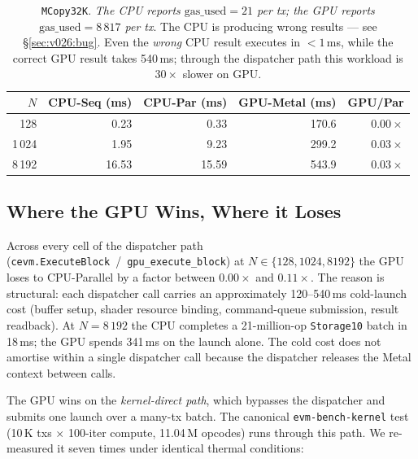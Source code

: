 \begin{table}[h]
\centering
\small
\begin{tabular}{rrrrr}
\toprule
$N$ & CPU-Seq (ms) & CPU-Par (ms) & GPU-Metal (ms) & GPU/Par \\
\midrule
128    & 0.23  & 0.33  & 170.6 & $0.00\times$ \\
1\,024 & 1.95  & 9.23  & 299.2 & $0.03\times$ \\
8\,192 & 16.53 & 15.59 & 543.9 & $0.03\times$ \\
\bottomrule
\end{tabular}
\caption{\texttt{MCopy32K}. \emph{The CPU reports
$\text{gas\_used} = 21$ per tx; the GPU reports $\text{gas\_used} =
8\,817$ per tx}. The CPU is producing wrong results --- see
\S\ref{sec:v026:bug}. Even the \emph{wrong} CPU result executes in
$<1$\,ms, while the correct GPU result takes 540\,ms; through the
dispatcher path this workload is $30\times$ slower on GPU.}
\label{tab:v026-mcopy}
\end{table}

\subsection{Where the GPU Wins, Where it Loses}
\label{sec:v026:winloss}

Across every cell of the dispatcher path
(\texttt{cevm.ExecuteBlock}~/~\texttt{gpu\_execute\_block}) at
$N \in \{128, 1024, 8192\}$ the GPU loses to CPU-Parallel by a factor
between $0.00\times$ and $0.11\times$. The reason is structural: each
dispatcher call carries an approximately 120--540\,ms cold-launch cost
(buffer setup, shader resource binding, command-queue submission,
result readback). At $N=8\,192$ the CPU completes a 21-million-op
\texttt{Storage10} batch in 18\,ms; the GPU spends 341\,ms on the
launch alone. The cold cost does not amortise within a single
dispatcher call because the dispatcher releases the Metal context
between calls.

The GPU wins on the \emph{kernel-direct path}, which bypasses the
dispatcher and submits one launch over a many-tx batch. The canonical
\texttt{evm-bench-kernel} test (10\,K txs $\times$ 100-iter compute,
11.04\,M opcodes) runs through this path. We re-measured it
seven times under identical thermal conditions:

